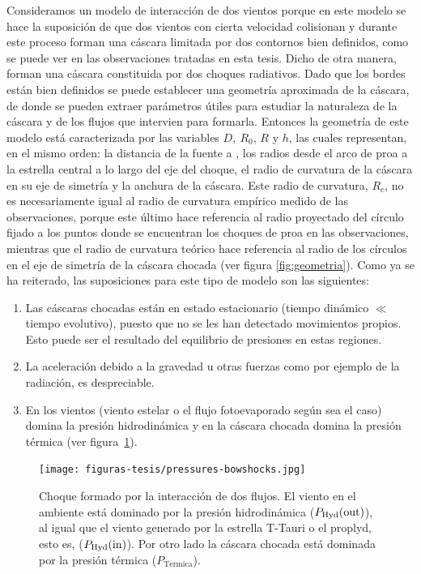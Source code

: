 Consideramos un modelo de interacción de dos vientos porque en este modelo se hace la suposición de que dos vientos con cierta velocidad colisionan y durante este proceso forman una cáscara limitada por dos contornos bien definidos, como se puede ver en las observaciones tratadas en esta tesis. Dicho de otra manera, forman una cáscara constituida por dos choques radiativos. Dado que los bordes están bien definidos se puede establecer una geometría aproximada de la cáscara, de donde se pueden extraer parámetros útiles para estudiar la naturaleza de la cáscara y de los flujos que intervien para formarla. Entonces la geometría de este modelo está caracterizada por las variables \(D,~R_{0}\), \(R\) y \(h\), las cuales representan, en el mismo orden: la distancia de la fuente a \thC{}, los radios desde el arco de proa a la estrella central a lo largo del eje del choque, el radio de curvatura de la cáscara en su eje de simetría y la anchura de la cáscara. Este radio de curvatura, \(R_{c}\), no es necesariamente igual al radio de curvatura empírico medido de las observaciones, porque este último hace referencia al radio proyectado del círculo fijado a los puntos donde se encuentran los choques de proa en las observaciones, mientras que el radio de curvatura teórico hace referencia al radio de los círculos en el eje de simetría de la cáscara chocada (ver figura \ref{fig:geometria}). Como ya se ha reiterado, las suposiciones para este tipo de modelo son las siguientes:
\begin{enumerate}
\item Las cáscaras chocadas están en estado estacionario (tiempo dinámico \(\ll\) tiempo evolutivo), puesto que no se les han detectado movimientos propios. Esto puede ser el resultado del equilibrio de presiones en estas regiones.
\item La aceleración debido a la gravedad u otras fuerzas como por ejemplo de la radiación, es despreciable.
\item En los vientos (viento estelar o el flujo fotoevaporado según sea el caso) domina la presión hidrodinámica y en la cáscara chocada domina la presión térmica (ver figura~\ref{fig:interaction}).  
\end{enumerate}

\begin{figure}
  \centering
  \texttt{[image: figuras-tesis/pressures-bowshocks.jpg]}
  \caption{Choque formado por la interacción de dos flujos. El viento en el ambiente está dominado por la presión hidrodinámica  (\(P_{\text{Hyd}}(\mathrm{out}{})\)), al igual que el viento generado por la estrella T-Tauri o el proplyd, esto es, (\(P_{\text{Hyd}}(\mathrm{in}{})\)). Por otro lado la cáscara chocada está dominada por la presión térmica (\(P_{\text{Termica}}\)).}
  \label{fig:interaction}
\end{figure}
 
